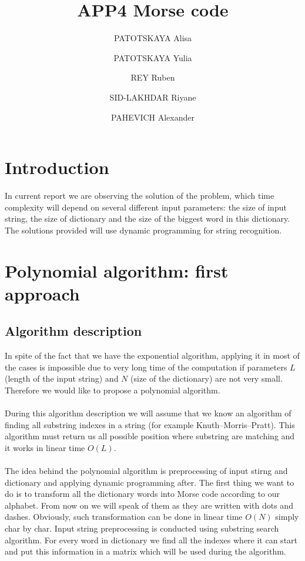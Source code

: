 \documentclass[a4paper]{article}
\title{APP4 Morse code}
\author{PATOTSKAYA Alisa \and PATOTSKAYA Yulia \and REY Ruben \and SID-LAKHDAR Riyane \and PAHEVICH Alexander}
\begin{document}
\maketitle


\tableofcontents



\section{Introduction}
In current report we are observing the solution of the problem, which time complexity will depend on several different input parameters: the size of input string, the size of dictionary and the size of the biggest word in this dictionary. The solutions provided will use dynamic programming for string recognition. 
\section{Polynomial algorithm: first approach}
\subsection{Algorithm description}
In spite of the fact that we have the exponential algorithm, applying it in most of the cases is impossible due to very long time of the computation if parameters $L$ (length of the input string) and $N$ (size of the dictionary) are not very small. Therefore we would like to propose a polynomial algorithm.\\\\
During this algorithm description we will assume that we know an algorithm of finding all substring indexes in a string (for example Knuth–Morris–Pratt). This algorithm must return us all possible position where substring are matching and it works in linear time $O(L)$.\\\\
The idea behind the polynomial algorithm is preprocessing of input stirng and dictionary and applying dynamic programming after. The first thing we want to do is to transform all the dictionary words into Morse code according to our alphabet. From now on we will speak of them as they are written with dots and dashes. Obviously, such transformation can be done in linear time $O(N)$ simply char by char. Input string preprocessing is conducted using substring search algorithm. For every word in dictionary we find all the indexes where it can start and put this information in a matrix which will be used during the algorithm.\\
\end{document}

